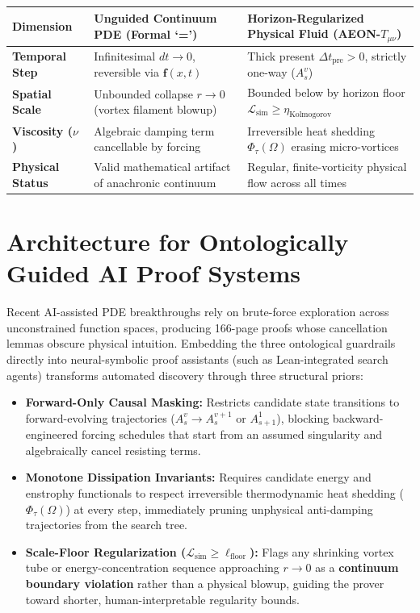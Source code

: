 \documentclass[11pt,a4paper]{article}
\begin{document}
\begin{center}
\begin{tabular}{p{3.0cm}p{5.4cm}p{5.6cm}}
\toprule
\textbf{Dimension} & \textbf{Unguided Continuum PDE (Formal `=')} & \textbf{Horizon-Regularized Physical Fluid (\textsc{AEON}-$T_{\mu\nu}$)} \\
\midrule
\textbf{Temporal Step} & Infinitesimal $dt \to 0$, reversible via $\mathbf{f}(x,t)$ & Thick present $\Delta t_{\text{pre}} > 0$, strictly one-way ($A_s^v$) \\
\textbf{Spatial Scale} & Unbounded collapse $r \to 0$ (vortex filament blowup) & Bounded below by horizon floor $\mathcal{L}_{\text{sim}} \ge \eta_{\text{Kolmogorov}}$ \\
\textbf{Viscosity ($\nu$)} & Algebraic damping term cancellable by forcing & Irreversible heat shedding $\Phi_\tau(\Omega)$ erasing micro-vortices \\
\textbf{Physical Status} & Valid mathematical artifact of anachronic continuum & Regular, finite-vorticity physical flow across all times \\
\bottomrule
\end{tabular}
\end{center}

\section{Architecture for Ontologically Guided AI Proof Systems}
Recent AI-assisted PDE breakthroughs rely on brute-force exploration across unconstrained function spaces, producing 166-page proofs whose cancellation lemmas obscure physical intuition. Embedding the three ontological guardrails directly into neural-symbolic proof assistants (such as Lean-integrated search agents) transforms automated discovery through three structural priors:
\begin{itemize}
  \item \textbf{Forward-Only Causal Masking:} Restricts candidate state transitions to forward-evolving trajectories ($A_s^v \to A_s^{v+1}$ or $A_{s+1}^1$), blocking backward-engineered forcing schedules that start from an assumed singularity and algebraically cancel resisting terms.
  \item \textbf{Monotone Dissipation Invariants:} Requires candidate energy and enstrophy functionals to respect irreversible thermodynamic heat shedding ($\Phi_\tau(\Omega)$) at every step, immediately pruning unphysical anti-damping trajectories from the search tree.
  \item \textbf{Scale-Floor Regularization ($\mathcal{L}_{\text{sim}} \ge \ell_{\text{floor}}$):} Flags any shrinking vortex tube or energy-concentration sequence approaching $r \to 0$ as a \textbf{continuum boundary violation} rather than a physical blowup, guiding the prover toward shorter, human-interpretable regularity bounds.
\end{itemize}
\end{document}
